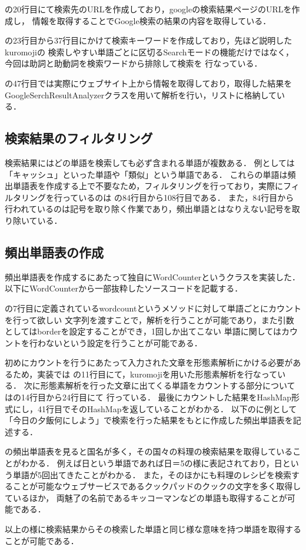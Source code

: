 の20行目にて検索先のURLを作成しており，googleの検索結果ページのURLを作成し，
情報を取得することでGoogle検索の結果の内容を取得している．

の23行目から37行目にかけて検索キーワードを作成しており，先ほど説明したkuromojiの
検索しやすい単語ごとに区切るSearchモードの機能だけではなく，今回は助詞と助動詞を検索ワードから排除して検索を
行なっている．

の47行目では実際にウェブサイト上から情報を取得しており，取得した結果を
GoogleSerchResultAnalyzerクラスを用いて解析を行い，リストに格納している．



\subsection{検索結果のフィルタリング}
検索結果にはどの単語を検索しても必ず含まれる単語が複数ある．
例としては「キャッシュ」といった単語や「類似」という単語である．
これらの単語は頻出単語表を作成する上で不要なため，フィルタリングを行っており，実際にフィルタリングを行っているのは
の84行目から108行目である．
また，84行目から行われているのは記号を取り除く作業であり，頻出単語とはなりえない記号を取り除いている．

\subsection{頻出単語表の作成}
頻出単語表を作成するにあたって独自にWordCounterというクラスを実装した．
以下にWordCounterから一部抜粋したソースコードを記載する．


の7行目に定義されているwordcountというメソッドに対して単語ごとにカウントを行って欲しい
文字列を渡すことで，解析を行うことが可能であり，また引数としてはborderを設定することができ，1回しか出てこない
単語に関してはカウントを行わないという設定を行うことが可能である．

初めにカウントを行うにあたって入力された文章を形態素解析にかける必要があるため，実装では
の11行目にて，kuromojiを用いた形態素解析を行なっている．
次に形態素解析を行った文章に出てくる単語をカウントする部分についてはの14行目から24行目にて
行っている．
最後にカウントした結果をHashMap形式にし，41行目でそのHashMapを返していることがわかる．
以下のに例として「今日の夕飯何にしよう」で検索を行った結果をもとに作成した頻出単語表を記述する．


の頻出単語表を見ると国名が多く，その国々の料理の検索結果を取得していることがわかる．
例えば日という単語であれば日＝5の様に表記されており，日という単語が5回出てきたことがわかる．
また，そのほかにも料理のレシピを検索することが可能なウェブサービスであるクックパッドのクックの文字を多く取得しているほか，
両魅了の名前であるキッコーマンなどの単語も取得することが可能である．

以上の様に検索結果からその検索した単語と同じ様な意味を持つ単語を取得することが可能である．
